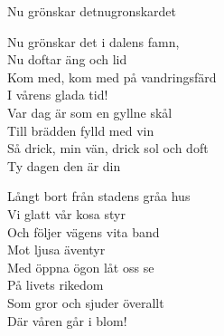 \begin{song}{Nu grönskar det}{nugronskardet}
\begin{vers}
Nu grönskar det i dalens famn, \\
Nu doftar äng och lid\\
Kom med, kom med på vandringsfärd\\
I vårens glada tid!\\
Var dag är som en gyllne skål\\
Till brädden fylld med vin\\
Så drick, min vän, drick sol och doft\\
Ty dagen den är din\\
\end{vers}
\begin{vers}
Långt bort från stadens gråa hus \\
Vi glatt vår kosa styr\\
Och följer vägens vita band\\
Mot ljusa äventyr\\
Med öppna ögon låt oss se\\
På livets rikedom\\
Som gror och sjuder överallt\\
Där våren går i blom!\\
\end{vers}
\end{song}
